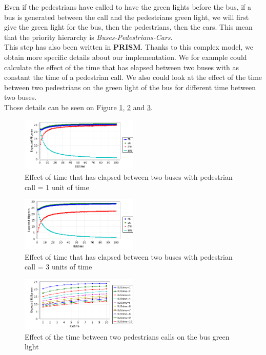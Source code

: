 \noindent Even if the pedestrians have called to have the green lights before the bus, if a bus is generated between the call and the pedestrians green light, we will first give the green light for the bus, then the pedestrians, then the cars. This mean that the priority hierarchy is \textit{Buses-Pedestrians-Cars}. \\
This step has also been written in \textbf{PRISM}. Thanks to this complex model, we obtain more specific details about our implementation. We for example could calculate the effect of the time that has elapsed between two buses with as constant the time of a pedestrian call. We also could look at the effect of the time between two pedestrians on the green light of the bus for different time between two buses. \\
Those details can be seen on Figure \ref{fig:cw1}, \ref{fig:cw3} and \ref{fig:busbus}.
\begin{figure}[H]\label{fig:cw1}
  \centering
    \includegraphics[width=0.5\textwidth]{picture/CWtime1.png}
    \caption{Effect of time that has elapsed between two buses with pedestrian call = 1 unit of time}
\end{figure}

\begin{figure}[H]\label{fig:cw3}
  \centering
    \includegraphics[width=0.5\textwidth]{picture/CWtime3.png}
    \caption{Effect of time that has elapsed between two buses with pedestrian call = 3 units of time}
\end{figure}

\begin{figure}[H]\label{fig:busbus}
  \centering
    \includegraphics[width=0.5\textwidth]{picture/CWtimeOnBUS.png}
    \caption{Effect of the time between two pedestrians calls on the bus green light}
\end{figure}


